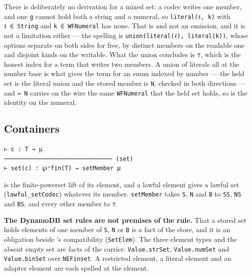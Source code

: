 There is deliberately no derivation for a mixed set: a codec writes one member, and one \texttt{g} cannot
hold both a string and a numeral, so \texttt{literal(ℓ,\ k)} with \texttt{ℓ\ ∈\ String} and \texttt{k\ ∈\ WFNumeral} has none. That is  and not an omission, and it is not
a limitation either — the spelling is \texttt{union(literal(ℓ),\ literal(k))}, whose options separate on
both sides for free, by distinct members on the readable one and disjoint kinds on the writable.
What the union concludes is \texttt{⊤}, which is the honest index for a term that writes two members. A union of
literals all at the number base is what gives the term for an enum indexed by number — the held set is the literal union and the
stored member is \texttt{N}, checked in both directions — and \texttt{⇝\ N} carries on the wire the same \texttt{WFNumeral}
that the held set holds, so  is the identity on the numeral.

\subsection{Containers}\label{containers}

\begin{definition}[(set)]
\label{rule:set}
\leanok
\begin{verbatim}
⊢ c : T ⇝ μ
─────────────────────────────── (set)
⊢ set(c) : ℘⁺fin(T) ⇝ setMember μ
\end{verbatim}
\end{definition}

 is the finite-powerset lift of its element, and a lawful element gives a lawful set
(\texttt{lawful\_setCodec}) whatever its member. \texttt{setMember} takes \texttt{S}, \texttt{N} and \texttt{B} to
\texttt{SS}, \texttt{NS} and \texttt{BS}, and every other member to \texttt{⊤}.

\textbf{The DynamoDB set rules are not premises of the rule.} That a stored set holds elements of one member of
\texttt{S}, \texttt{N} or \texttt{B} is a fact of the store, and it is an obligation beside 's
compatibility (\texttt{SetElem}). The three element types and the absent empty set are facts of the carrier:
\texttt{Value.strSet}, \texttt{Value.numSet} and \texttt{Value.binSet} over \texttt{NEFinset}. A restricted element, a
literal element and an adapter element are each spelled at the element.

